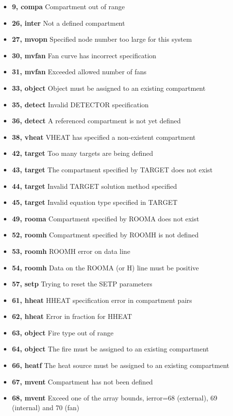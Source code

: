 \begin{itemize}
\item \textbf{9, compa} Compartment out of range
\item \textbf{26, inter} Not a defined compartment
\item \textbf{27, mvopn} Specified node number too large for this system
\item \textbf{30, mvfan} Fan curve has incorrect specification
\item \textbf{31, mvfan} Exceeded allowed number of fans
\item \textbf{33, object} Object must be assigned to an existing compartment
\item \textbf{35, detect} Invalid DETECTOR specification
\item \textbf{36, detect} A referenced compartment is not yet defined
\item \textbf{38, vheat} VHEAT has specified a non-existent compartment
\item \textbf{42, target} Too many targets are being defined
\item \textbf{43, target} The compartment specified by TARGET does not exist
\item \textbf{44, target} Invalid TARGET solution method specified
\item \textbf{45,  target} Invalid equation type specified in TARGET
\item \textbf{49, rooma} Compartment specified by ROOMA does not exist
\item \textbf{52, roomh} Compartment specified by ROOMH is not defined
\item \textbf{53, roomh} ROOMH error on data line
\item \textbf{54, roomh} Data on the ROOMA (or H) line must be positive
\item \textbf{57, setp} Trying to reset the SETP parameters
\item \textbf{61, hheat} HHEAT specification error in compartment pairs
\item \textbf{62, hheat} Error in fraction for HHEAT
\item \textbf{63, object} Fire type out of range
\item \textbf{64, object} The fire must be assigned to an existing compartment
\item \textbf{66, heatf} The heat source must be assigned to an existing compartment
\item \textbf{67, mvent} Compartment has not been defined
\item \textbf{68, mvent} Exceed one of the array bounds, ierror=68 (external), 69 (internal)  and 70 (fan)

\end{itemize}
